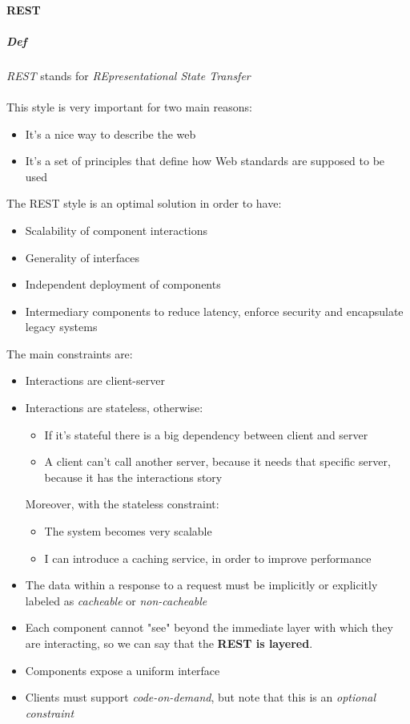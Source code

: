     \paragraph{REST}
    \subparagraph{Def}
    \textit{REST} stands for \textit{REpresentational State Transfer}\\
    \\
    This style is very important for two main reasons:
    \begin{itemize}
        \item It's a nice way to describe the web
        \item It's a set of principles that define how Web standards are supposed to be used
    \end{itemize}
    The REST style is an optimal solution in order to have:
    \begin{itemize}
        \item Scalability of component interactions
        \item Generality of interfaces
        \item Independent deployment of components
        \item Intermediary components to reduce latency, enforce
            security and encapsulate legacy systems
    \end{itemize}
    The main constraints are:
    \begin{itemize}
        \item Interactions are client-server
        \item Interactions are stateless, otherwise:
        \begin{itemize}
                \item If it's stateful there is a big dependency between client
                        and server
                \item A client can't call another server, because it needs that
                        specific server, because it has the interactions story 
        \end{itemize}
            Moreover, with the stateless constraint:
        \begin{itemize}
            \item The system becomes very scalable
            \item I can introduce a caching service, in order to improve performance
        \end{itemize} 
        \item The data within a response to a request must be implicitly or explicitly
            labeled as \textit{cacheable} or \textit{non-cacheable}
        \item Each component cannot "see" beyond the immediate layer with which they
            are interacting, so we can say that the \textbf{REST is layered}.
        \item Components expose a uniform interface
        \item Clients must support \textit{code-on-demand}, but note that this is an 
            \textsl{optional constraint}
    \end{itemize}
    
